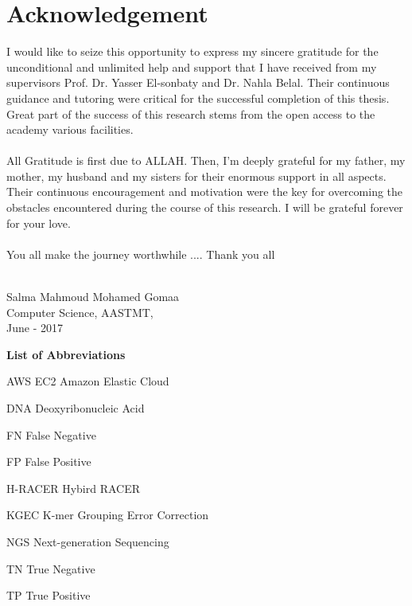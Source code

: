 \documentclass[12pt,openany]{llncs}
\newcommand{\abbrlabel}[1]{\makebox[3cm][l]{\textbf{#1}\ \dotfill}}
\newenvironment{abbreviations}{\begin{list}{}{\renewcommand{\makelabel}{\abbrlabel}}}{\end{list}}
\begin{document}
\clearpage\thispagestyle{empty}
\section*{Acknowledgement}

I would like to seize this opportunity to express my sincere gratitude for the
unconditional and unlimited help and support that I have received from my supervisors Prof.
Dr. Yasser El-sonbaty and Dr. Nahla Belal. Their continuous guidance and tutoring were
critical for the successful completion of this thesis. Great part of the success of this research stems from the open access to the academy various facilities. 
\\
\\
All Gratitude is first due to ALLAH. Then, I'm deeply grateful for my father, my mother, my husband and my sisters for their enormous support in all aspects. Their continuous encouragement and motivation were the key for overcoming the obstacles encountered during the course of this research. I will be grateful forever for your love.
\\
\\
You all make the journey worthwhile .... Thank you all
\\
\\
\begin{flushright}
Salma Mahmoud Mohamed Gomaa\\
Computer Science, AASTMT,\\
June - 2017
\end{flushright}

\newpage
\tableofcontents
\newpage
\listoffigures
\newpage
\listoftables
\newpage

{\Huge\bfseries List of Abbreviations}
\\
\begin{abbreviations}
\item[AWS EC2] Amazon Elastic Cloud
\item[DNA] Deoxyribonucleic Acid
\item[FN] False Negative
\item[FP] False Positive
\item[H-RACER] Hybird RACER
\item[KGEC] K-mer Grouping Error Correction
\item[NGS] Next-generation Sequencing
\item[TN] True Negative
\item[TP] True Positive
\end{abbreviations}
\end{document}

